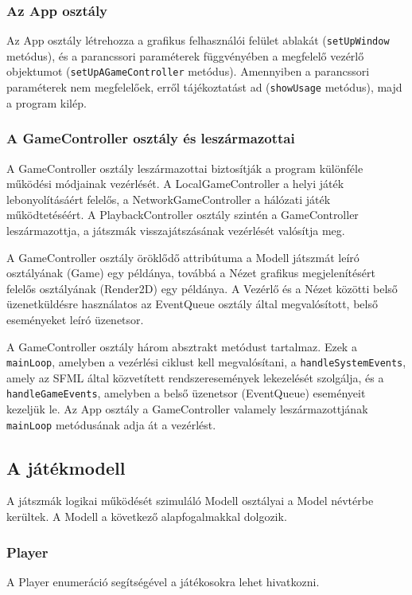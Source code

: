 \documentclass[12pt, twoside]{report}
\begin{document}
\subsubsection{Az App osztály}

Az App osztály létrehozza a grafikus felhasználói felület ablakát ({\tt setUpWindow} metódus), és a parancssori paraméterek függvényében a megfelelő vezérlő objektumot ({\tt setUpAGameController} metódus). Amennyiben a parancssori paraméterek nem megfelelőek, erről tájékoztatást ad ({\tt showUsage} metódus), majd a program kilép.

\subsubsection{A GameController osztály és leszármazottai}

A GameController osztály leszármazottai biztosítják a program különféle működési módjainak vezérlését. A LocalGameController a helyi játék lebonyolításáért felelős, a NetworkGameController a hálózati játék működtetéséért. A PlaybackController osztály szintén a GameController leszármazottja, a játszmák visszajátszásának vezérlését valósítja meg.

A GameController osztály öröklődő attribútuma a Modell játszmát leíró osztályának (Game) egy példánya, továbbá a Nézet grafikus megjelenítésért felelős osztályának (Render2D) egy példánya. A Vezérlő és a Nézet közötti belső üzenetküldésre használatos az EventQueue osztály által megvalósított, belső eseményeket leíró üzenetsor. 

A GameController osztály három absztrakt metódust tartalmaz. Ezek a {\tt mainLoop}, amelyben a vezérlési ciklust kell megvalósítani, a {\tt handleSystemEvents}, amely az SFML által közvetített rendszeresemények lekezelését szolgálja, és a {\tt handleGameEvents}, amelyben a belső üzenetsor (EventQueue) eseményeit kezeljük le. Az App osztály a \break GameController valamely leszármazottjának {\tt mainLoop} metódusának adja át a vezérlést.

\subsection {A játékmodell}

A játszmák logikai működését szimuláló Modell osztályai a Model névtérbe kerültek. A Modell a következő alapfogalmakkal dolgozik.

\subsubsection {Player}
A Player enumeráció segítségével a játékosokra lehet hivatkozni.
\end{document}
